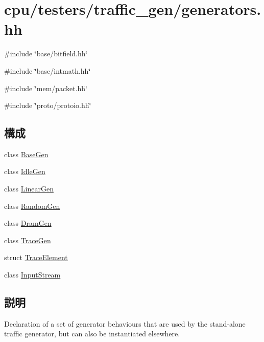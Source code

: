 \hypertarget{generators_8hh}{
\section{cpu/testers/traffic\_\-gen/generators.hh}
\label{generators_8hh}
}
{\ttfamily \#include \char`\"{}base/bitfield.hh\char`\"{}}\par
{\ttfamily \#include \char`\"{}base/intmath.hh\char`\"{}}\par
{\ttfamily \#include \char`\"{}mem/packet.hh\char`\"{}}\par
{\ttfamily \#include \char`\"{}proto/protoio.hh\char`\"{}}\par
\subsection*{構成}
\begin{DoxyCompactItemize}
\item 
class \hyperlink{classBaseGen}{BaseGen}
\item 
class \hyperlink{classIdleGen}{IdleGen}
\item 
class \hyperlink{classLinearGen}{LinearGen}
\item 
class \hyperlink{classRandomGen}{RandomGen}
\item 
class \hyperlink{classDramGen}{DramGen}
\item 
class \hyperlink{classTraceGen}{TraceGen}
\item 
struct \hyperlink{structTraceGen_1_1TraceElement}{TraceElement}
\item 
class \hyperlink{classTraceGen_1_1InputStream}{InputStream}
\end{DoxyCompactItemize}


\subsection{説明}
Declaration of a set of generator behaviours that are used by the stand-\/alone traffic generator, but can also be instantiated elsewhere. 